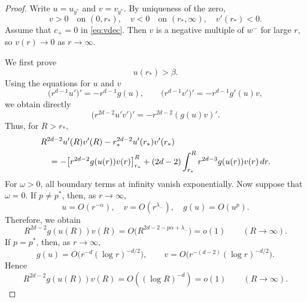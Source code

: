 \documentclass[12pt, a4paper, reqno]{amsart}
\numberwithin{equation}{section}
\theoremstyle{definition}
\theoremstyle{remark}
\begin{document}
\begin{proof}
Write $u=u_{y^*}$ and $v=v_{y^*}$. By uniqueness of the zero,
\begin{equation}\label{eq:vsign}
  v>0\quad\text{on }(0,r_*),
  \quad
  v<0\quad\text{on }(r_*,\infty),
  \quad
  v'(r_*)<0.
\end{equation}
Assume that $c_+=0$ in \eqref{eq:vdec}. Then $v$ is a negative multiple
of $w^-$ for large $r$, so $v(r)\to0$ as $r\to\infty$.

We first prove
\begin{equation}\label{eq:ubeta}
  u(r_*)>\beta.
\end{equation}
Using the equations for $u$ and $v$
\[
  \bigl(r^{d-1}u'\bigr)'=-r^{d-1}g(u),
  \qquad
  \bigl(r^{d-1}v'\bigr)'=-r^{d-1}g'(u)v,
\]
we obtain directly
\begin{equation}\label{eq:prod}
  \bigl(r^{2d-2}u'v'\bigr)'=-r^{2d-2}(g(u)v)'.
\end{equation}
Thus, for $R>r_*$,
\begin{align}
& R^{2d-2}u'(R)v'(R)
  -r_*^{2d-2}u'(r_*)v'(r_*)
  \notag\\
&\quad=-\bigl[r^{2d-2}g(u(r))v(r)\bigr]_{r_*}^{R}
  +(2d-2)\int_{r_*}^R r^{2d-3}g(u(r))v(r)\,dr.
  \label{eq:pint}
\end{align}
For $\omega>0$, all boundary terms at infinity vanish exponentially. Now
suppose that $\omega=0$. If $p\ne p^*$, then, as $r\to\infty$,
\[
  u=O(r^{-\alpha}),
  \quad
  v=O(r^{\lambda_-}),
  \quad
  g(u)=O(u^p).
\]
Therefore, we obtain
\[
  R^{2d-2}g(u(R))v(R)
  =O\bigl(R^{2d-2-p\alpha+\lambda_-}\bigr)=o(1)
  \qquad(R\to\infty).
\]
If $p=p^*$, then, as $r\to\infty$,
\[
  g(u)=O\bigl(r^{-d}(\log r)^{-d/2}\bigr),
  \qquad
  v=O\bigl(r^{-(d-2)}(\log r)^{-d/2}\bigr).
\]
Hence
\begin{equation*}
  R^{2d-2}g(u(R))v(R)=O((\log R)^{-d})=o(1)
  \qquad(R\to\infty).
\end{equation*}


\end{proof}
\end{document}
